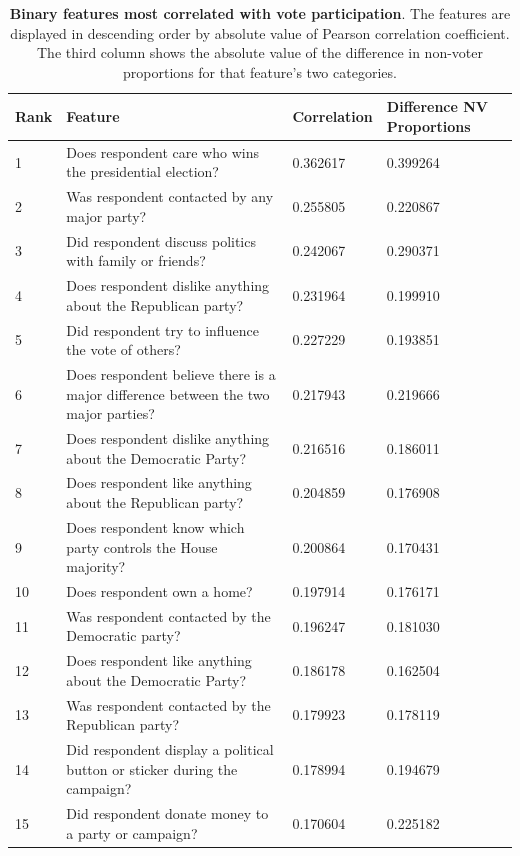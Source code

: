 \documentclass{article}
\begin{document}
	\begin{table}[h!]
		\begin{center}
			\begin{tabular}{ |m{1cm}|m{9cm}|m{2cm}|m{2.5cm}| } 
				\hline
				Rank & Feature & Correlation & Difference NV Proportions  \\ 
				\hline
				1 & Does respondent care who wins the presidential election? & 0.362617 & 0.399264 \\ 
				\hline
				2 & Was respondent contacted by any major party? & 0.255805 & 0.220867 \\ 
				\hline
				3 & Did respondent discuss politics with family or friends? & 0.242067 & 0.290371 \\
				\hline
				4 & Does respondent dislike anything about the Republican party? & 0.231964 & 0.199910 \\
				\hline
				5 & Did respondent try to influence the vote of others? & 0.227229 & 0.193851 \\
				\hline
				6 & Does respondent believe there is a major difference between the two major parties? & 0.217943 & 0.219666 \\
				\hline
				7 & Does respondent dislike anything about the Democratic Party? & 0.216516 & 0.186011 \\
				\hline
				8 & Does respondent like anything about the Republican party? & 0.204859 & 0.176908 \\
				\hline
				9 & Does respondent know which party controls the House majority? & 0.200864 & 0.170431 \\
				\hline
				10 & Does respondent own a home? & 0.197914 & 0.176171 \\
				\hline
				11 & Was respondent contacted by the Democratic party? & 0.196247 & 0.181030 \\
				\hline
				12 & Does respondent like anything about the Democratic Party? & 0.186178 & 0.162504 \\
				\hline
				13 & Was respondent contacted by the Republican party?
				 & 0.179923 & 0.178119 \\
				\hline
				14 & Did respondent display a political button or sticker during the campaign? & 0.178994 & 0.194679 \\
				\hline
				15 & Did respondent donate money to a party or campaign? & 0.170604 & 0.225182 \\
				\hline				
			\end{tabular}
			\caption{\textbf{Binary features most correlated with vote participation}. The features are displayed in descending order by absolute value of Pearson correlation coefficient. The third column shows the absolute value of the difference in non-voter proportions for that feature's two categories.}
			\label{table:binary_features_most_correlated}
		\end{center}
	\end{table}
\end{document}
